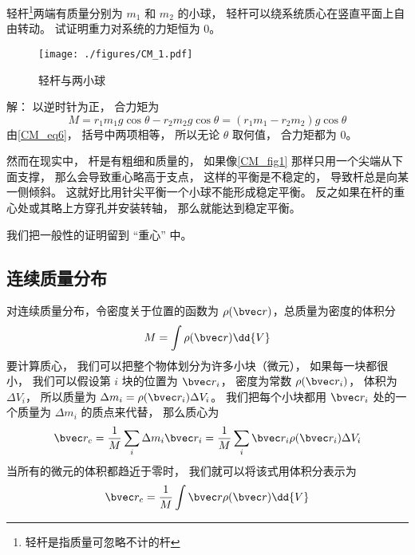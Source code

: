 \begin{example}{}\label{CM_ex1}
轻杆\footnote{轻杆是指质量可忽略不计的杆}两端有质量分别为 $m_1$ 和 $m_2$ 的小球， 轻杆可以绕系统质心在竖直平面上自由转动。 试证明重力对系统的力矩恒为 0。

\begin{figure}[ht]
\centering
\texttt{[image: ./figures/CM\_1.pdf]}
\caption{轻杆与两小球} \label{CM_fig1}
\end{figure}

解： 以逆时针为正， 合力矩为
\begin{equation}
M = r_1 m_1 g \cos\theta - r_2 m_2 g \cos\theta = (r_1 m_1 - r_2 m_2) g \cos\theta
\end{equation}
由\autoref{CM_eq6}， 括号中两项相等， 所以无论 $\theta$ 取何值， 合力矩都为 0。

然而在现实中， 杆是有粗细和质量的， 如果像\autoref{CM_fig1} 那样只用一个尖端从下面支撑， 那么会导致重心略高于支点， 这样的平衡是不稳定的， 导致杆总是向某一侧倾斜。 这就好比用针尖平衡一个小球不能形成稳定平衡。 反之如果在杆的重心处或其略上方穿孔并安装转轴， 那么就能达到稳定平衡。
\end{example}
我们把一般性的证明留到 “重心” 中。

\subsection{连续质量分布}

对连续质量分布，令密度关于位置的函数为 $\rho (\bvec r)$，总质量为密度的体积分 %
\begin{equation}
M = \int \rho (\bvec r) \dd{V}
\end{equation}
要计算质心， 我们可以把整个物体划分为许多小块（微元）， 如果每一块都很小， 我们可以假设第 $i$ 块的位置为 $\bvec r_i$， 密度为常数 $\rho(\bvec r_i)$， 体积为 $\Delta V_i$， 所以质量为 $\Delta m_i = \rho(\bvec r_i) \Delta V_i$。 我们把每个小块都用 $\bvec r_i$ 处的一个质量为 $\Delta m_i$ 的质点来代替， 那么质心为
\begin{equation}
\bvec r_c = \frac{1}{M} \sum_i \Delta m_i \bvec r_i = \frac{1}{M} \sum_i \bvec r_i \rho(\bvec r_i) \Delta V_i
\end{equation}
当所有的微元的体积都趋近于零时， 我们就可以将该式用体积分表示为
\begin{equation}\label{CM_eq9}
\bvec r_c = \frac{1}{M}\int \bvec r\rho (\bvec r) \dd{V}
\end{equation}

